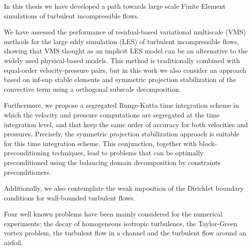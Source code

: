 In this thesis we have developed a path towards large scale Finite Element simulations of turbulent incompressible flows.

We have assessed the performance of residual-based variational multiscale (VMS) methods for the large eddy simulation (LES) of turbulent incompressible flows, showing that VMS thought as an implicit LES model can be an alternative to the widely used physical-based models. This method is traditionally combined with equal-order velocity-pressure pairs, but in this work we also consider an approach based on inf-sup stable elements and symmetric projection stabilization of the convective term using a orthogonal subscale decomposition.

Furthermore, we propose a segregated Runge-Kutta time integration scheme in which the velocity and pressure computations are segregated at the time integration level, and that keep the same order of accuracy for both velocities and pressures. Precisely, the symmetric projection stabilization approach is suitable for this time integration scheme. This conjunction, together with block-preconditioning techniques, lead to problems that can be optimally preconditioned using the balancing domain decomposition by constraints preconditioners.

Additionally, we also contemplate the weak imposition of the Dirichlet boundary conditions for wall-bounded turbulent flows.

Four well known problems have been mainly considered for the numerical experiments: the decay of homogeneous isotropic turbulence, the Taylor-Green vortex problem, the turbulent flow in a channel and the turbulent flow around an airfoil.


